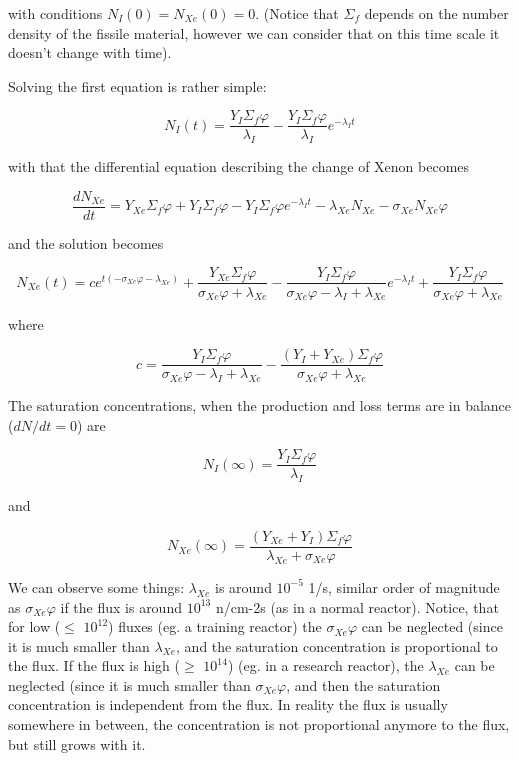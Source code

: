 with conditions $N_I(0)=N_{Xe}(0)=0$. (Notice that $\Sigma_f$ depends on the number density of the fissile material, however we can consider that on this time scale it doesn't change with time).

Solving the first equation is rather simple:

$$ N_I(t)=\frac{Y_I\Sigma_f\varphi}{\lambda_I} - \frac{Y_I\Sigma_f\varphi}{\lambda_I}e^{-\lambda_It} $$

\noindent with that the differential equation describing the change of Xenon becomes

$$ \frac{dN_{Xe}}{dt}=Y_{Xe}\Sigma_f\varphi + Y_I\Sigma_f\varphi - Y_I\Sigma_f\varphi e^{-\lambda_It} -\lambda_{Xe}N_{Xe} - \sigma_{Xe}N_{Xe}\varphi  $$

\noindent and the solution becomes

$$ N_{Xe}(t) = c e^{t(-\sigma_{Xe}\varphi - \lambda_{Xe})} + \frac{Y_{Xe}\Sigma_f\varphi}{\sigma_{Xe}\varphi + \lambda_{Xe}} - \frac{Y_I\Sigma_f\varphi}{\sigma_{Xe}\varphi-\lambda_I + \lambda_{Xe}}e^{-\lambda_It} + \frac{Y_{I}\Sigma_f\varphi}{\sigma_{Xe}\varphi + \lambda_{Xe}}  $$

\noindent where 

$$ c= \frac{Y_I\Sigma_f\varphi}{\sigma_{Xe}\varphi-\lambda_I + \lambda_{Xe}}  -\frac{(Y_{I}+Y_{Xe})\Sigma_f\varphi}{\sigma_{Xe}\varphi + \lambda_{Xe}}   $$


The saturation concentrations, when the production and loss terms are in balance ($dN/dt = 0$) are

$$N_I(\infty) = \frac{Y_I\Sigma_f\varphi}{\lambda_I} $$

\noindent and 

$$N_{Xe}(\infty) = \frac{(Y_{Xe}+Y_I)\Sigma_f\varphi}{\lambda_{Xe} + \sigma_{Xe}\varphi} $$

We can observe some things: $\lambda_{Xe}$ is around $10^{-5}$ 1/s, similar order of magnitude as $\sigma_{Xe}\varphi$ if the flux is around $10^{13}$ n/cm-2s (as in a normal reactor).  Notice, that for low ($\leq$ $10^{12}$) fluxes (eg. a training reactor)  the $\sigma_{Xe}\varphi$ can be neglected (since it is much smaller than $\lambda_{Xe}$, and the saturation concentration is proportional to the flux. If the flux is high ($\geq$ $10^{14}$) (eg. in a research reactor), the $\lambda_{Xe}$ can be neglected (since it is much smaller than $\sigma_{Xe}\varphi$, and then the saturation concentration is independent from the flux. In reality the flux is usually somewhere in between, the concentration is not proportional anymore to the flux, but still grows with it.


